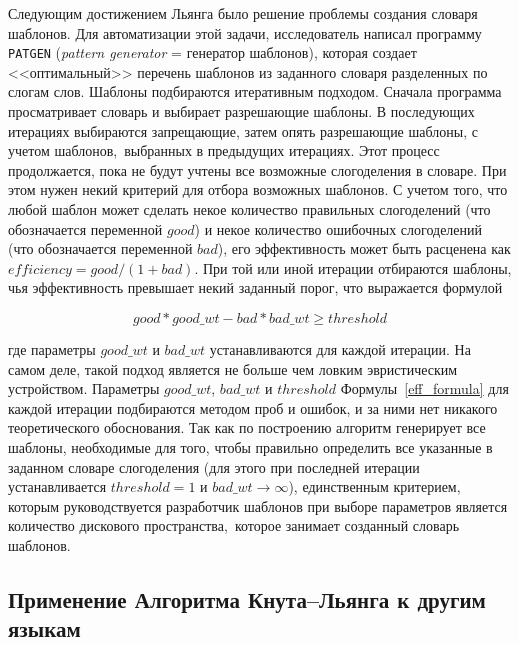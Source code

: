 \documentclass[12pt,a4paper,oneside]{extarticle}
\begin{document}
Следующим достижением Льянга было решение проблемы создания словаря шаблонов. Для автоматизации этой задачи, исследователь написал программу \verb+PATGEN+ (\emph{pattern generator} = генератор шаблонов), которая создает <<оптимальный>> перечень шаблонов из заданного словаря разделенных по слогам слов. Шаблоны подбираются итеративным подходом. Сначала программа просматривает словарь и выбирает разрешающие шаблоны. В последующих итерациях выбираются запрещающие, затем опять разрешающие шаблоны, с учетом шаблонов, выбранных в предыдущих итерациях. Этот процесс продолжается, пока не будут учтены все возможные слогоделения в словаре. При этом нужен некий критерий для отбора возможных шаблонов. С учетом того, что любой шаблон может сделать некое количество правильных слогоделений (что обозначается переменной $good$) и некое количество ошибочных слогоделений (что обозначается переменной $bad$), его эффективность может быть расценена как $efficiency = good / (1 + bad)$. При той или иной итерации отбираются шаблоны, чья эффективность превышает некий заданный порог, что выражается формулой

\begin{equation}
\label{eff_formula}
good * good\_wt - bad * bad\_wt \geq threshold
\end{equation}

\noindent где параметры $good\_wt$ и $bad\_wt$ устанавливаются для каждой итерации. На самом деле, такой подход является не больше чем ловким эвристическим устройством. Параметры $good\_wt$, $bad\_wt$ и $threshold$ Формулы~\ref{eff_formula} для каждой итерации подбираются методом проб и ошибок, и за ними нет никакого теоретического обоснования\autocite[Ср.: <<We do not have any theoretical justification for these parameters; they just seem to work well>>.][p.~36]{liang1983}. Так как по построению алгоритм генерирует все шаблоны, необходимые для того, чтобы правильно определить все указанные в заданном словаре слогоделения (для этого при последней итерации устанавливается $threshold = 1$ и $bad\_wt \rightarrow \infty$), единственным критерием, которым руководствуется разработчик шаблонов при выборе параметров является количество дискового пространства, которое занимает созданный словарь шаблонов.

\subsection{Применение Алгоритма Кнута--Льянга к другим языкам}
\end{document}
